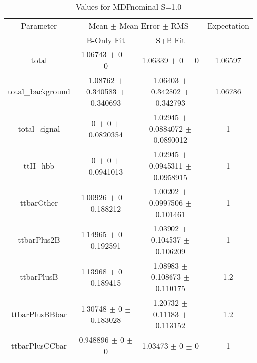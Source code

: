 \begin{table}
\centering
\caption{Values for MDFnominal S=1.0}
\begin{tabular}{cccc}
\toprule
Parameter & \multicolumn{2}{c}{Mean $\pm$ Mean Error $\pm$ RMS} & Expectation\\
 & B-Only Fit & S+B Fit & \\
\midrule
total & \num{1.06743} $\pm$ \num{0} $\pm$ \num{0} & \num{1.06339} $\pm$ \num{0} $\pm$ \num{0} & \num{1.06597}\\
total\_background & \num{1.08762} $\pm$ \num{0.340583} $\pm$ \num{0.340693} & \num{1.06403} $\pm$ \num{0.342802} $\pm$ \num{0.342793} & \num{1.06786}\\
total\_signal & \num{0} $\pm$ \num{0} $\pm$ \num{0.0820354} & \num{1.02945} $\pm$ \num{0.0884072} $\pm$ \num{0.0890012} & \num{1}\\
ttH\_hbb & \num{0} $\pm$ \num{0} $\pm$ \num{0.0941013} & \num{1.02945} $\pm$ \num{0.0945311} $\pm$ \num{0.0958915} & \num{1}\\
ttbarOther & \num{1.00926} $\pm$ \num{0} $\pm$ \num{0.188212} & \num{1.00202} $\pm$ \num{0.0997506} $\pm$ \num{0.101461} & \num{1}\\
ttbarPlus2B & \num{1.14965} $\pm$ \num{0} $\pm$ \num{0.192591} & \num{1.03902} $\pm$ \num{0.104537} $\pm$ \num{0.106209} & \num{1}\\
ttbarPlusB & \num{1.13968} $\pm$ \num{0} $\pm$ \num{0.189415} & \num{1.08983} $\pm$ \num{0.108673} $\pm$ \num{0.110175} & \num{1.2}\\
ttbarPlusBBbar & \num{1.30748} $\pm$ \num{0} $\pm$ \num{0.183028} & \num{1.20732} $\pm$ \num{0.11183} $\pm$ \num{0.113152} & \num{1.2}\\
ttbarPlusCCbar & \num{0.948896} $\pm$ \num{0} $\pm$ \num{0} & \num{1.03473} $\pm$ \num{0} $\pm$ \num{0} & \num{1}\\
\bottomrule
\end{tabular}
\end{table}